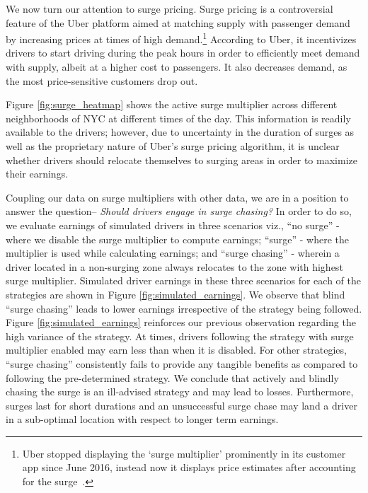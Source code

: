 We now turn our attention to surge pricing. Surge pricing is a controversial feature of the Uber platform
aimed at matching supply with passenger demand by increasing prices at times of high demand.\footnote{Uber stopped displaying the `surge multiplier' prominently in its customer app since June 2016, instead now it displays price estimates after accounting for the surge~\cite{surge}.}  
According to Uber, it incentivizes drivers to start driving during the peak hours in order to efficiently meet demand with 
  supply, albeit at a higher cost to passengers.
It also decreases demand, as the most price-sensitive customers drop out. 

Figure \ref{fig:surge_heatmap} shows the active surge multiplier across different neighborhoods of NYC at 
different times of the day. 
This information is readily available to the drivers; however, due to uncertainty in the duration of surges 
  as well as the proprietary nature of Uber's surge pricing algorithm, 
  it is unclear whether drivers should relocate themselves to surging areas in order to maximize their earnings. 

Coupling our data on surge multipliers with other data, we are in a position to answer the question-- \textit{Should drivers engage in surge chasing?}
In order to do so, we evaluate earnings of simulated drivers in three scenarios viz., 
``no surge'' - where we disable the surge multiplier to compute earnings; ``surge'' - 
where the multiplier is used while calculating earnings; and ``surge chasing'' -
wherein a driver located in a non-surging zone always relocates to the zone with highest surge multiplier. 
Simulated driver earnings in these three scenarios for each of the strategies are shown in Figure {\ref{fig:simulated_earnings}}. 
We observe that blind ``surge chasing'' leads to lower earnings irrespective of the strategy being followed. 
Figure \ref{fig:simulated_earnings} reinforces our previous observation regarding the high variance of the {\naive} strategy. 
At times, drivers following the {\naive} strategy with surge multiplier enabled may earn less than when it is disabled. 
For other strategies, ``surge chasing'' consistently fails to provide any tangible benefits as compared to 
following the pre-determined strategy. We conclude that actively and blindly chasing the surge is an ill-advised 
strategy and may lead to losses. Furthermore, surges last for short durations and an unsuccessful surge chase 
may land a driver in a sub-optimal location with respect to longer term earnings. 

